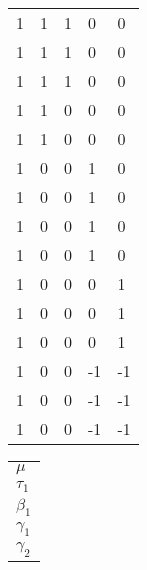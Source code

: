 \documentclass[
  10pt,
  twocolumn]{article}
\begin{document}
\begin{tabular}{l|l|l|ll|}
1& 1 &1& 0 & 0 \\
1& 1 &1& 0 & 0 \\
1& 1 &1& 0 & 0\\\hline
1& 1 &0& 0 & 0\\
1& 1 &0& 0 & 0\\\hline
1& 0 &0& 1 & 0\\
1& 0 &0& 1 & 0\\
1& 0 &0& 1 & 0\\
1& 0 &0& 1 & 0\\\hline
1& 0 &0& 0 & 1\\
1& 0 &0& 0 & 1\\
1& 0 &0& 0 & 1\\
1& 0 &0&-1 &-1\\
1& 0 &0&-1 &-1\\
1& 0 &0&-1 &-1\\
\end{tabular}
\begin{tabular}{|l|}
$\mu$\\
$\tau_{1}$\\
$\beta_{1}$\\
$\gamma_{1}$\\
$\gamma_{2}$\\
\end{tabular}
\end{document}
